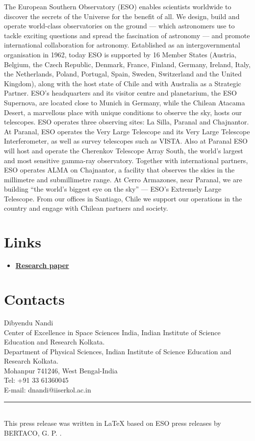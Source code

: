 \documentclass{article}
\begin{document}
The European Southern Observatory (ESO) enables scientists worldwide to discover the secrets of the Universe for the benefit of all. We design, build and operate world-class observatories on the ground — which astronomers use to tackle exciting questions and spread the fascination of astronomy — and promote international collaboration for astronomy. Established as an intergovernmental organisation in 1962, today ESO is supported by 16 Member States (Austria, Belgium, the Czech Republic, Denmark, France, Finland, Germany, Ireland, Italy, the Netherlands, Poland, Portugal, Spain, Sweden, Switzerland and the United Kingdom), along with the host state of Chile and with Australia as a Strategic Partner. ESO’s headquarters and its visitor centre and planetarium, the ESO Supernova, are located close to Munich in Germany, while the Chilean Atacama Desert, a marvellous place with unique conditions to observe the sky, hosts our telescopes. ESO operates three observing sites: La Silla, Paranal and Chajnantor. At Paranal, ESO operates the Very Large Telescope and its Very Large Telescope Interferometer, as well as survey telescopes such as VISTA. Also at Paranal ESO will host and operate the Cherenkov Telescope Array South, the world’s largest and most sensitive gamma-ray observatory. Together with international partners, ESO operates ALMA on Chajnantor, a facility that observes the skies in the millimetre and submillimetre range. At Cerro Armazones, near Paranal, we are building “the world’s biggest eye on the sky” — ESO’s Extremely Large Telescope. From our offices in Santiago, Chile we support our operations in the country and engage with Chilean partners and society. 


\section*{\LARGE Links}

\begin{itemize}[label=$\bullet$] %
    \item \textbf{\href{https://doi.org/10.1093/mnrasl/slad122}{Research paper}} 
\end{itemize}

\section*{\LARGE Contacts} 

Dibyendu Nandi\\
Center of Excellence in Space Sciences India, Indian Institute of Science Education and Research Kolkata.\\
Department of Physical Sciences, Indian Institute of Science Education and Research Kolkata.\\
Mohanpur 741246, West Bengal-India\\
Tel: +91 33 61360045\\
E-mail: dnandi@iiserkol.ac.in


\begin{flushleft}
    \rule{6cm}{0.5pt}\\
    {\footnotesize{This press release was written in \LaTeX{} based on ESO press releases by BERTACO, G. P. .}}
\end{flushleft}
\end{document}
